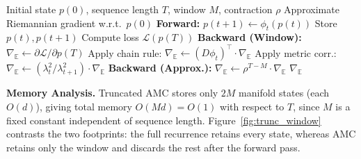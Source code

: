 \documentclass[a4paper,fleqn]{cas-dc}
\begin{document}
\begin{algorithm}[htbp]
\footnotesize
\caption{Truncated AMC with $O(M)$ Stored States}
\label{alg:dvm_truncated}
\begin{algorithmic}[1]
\Require Initial state $p(0)$, sequence length $T$, window $M$, contraction $\rho$
\Ensure Approximate Riemannian gradient w.r.t.\ $p(0)$
\State \textbf{Forward:}
    \State $p(t+1) \leftarrow \phi_t(p(t))$
        \State Store $p(t), p(t+1)$ 
    \EndIf
\EndFor
\State Compute loss $\mathcal{L}(p(T))$
\State \textbf{Backward (Window):}
\State $\nabla_{\mathbb{E}} \leftarrow \partial\mathcal{L}/\partial p(T)$
    \State Apply chain rule: $\nabla_{\mathbb{E}} \leftarrow (D\phi_t)^\top \cdot \nabla_{\mathbb{E}}$
    \State Apply metric corr.: $\nabla_{\mathbb{E}} \leftarrow (\lambda_t^2/\lambda_{t+1}^2) \cdot \nabla_{\mathbb{E}}$
\EndFor
\State \textbf{Backward (Approx.):}
\State $\nabla_{\mathbb{E}} \leftarrow \rho^{T-M} \cdot \nabla_{\mathbb{E}}$ 
\State \Return $\nabla_{\mathbb{E}}$
\end{algorithmic}
\end{algorithm}

\textbf{Memory Analysis.} Truncated AMC stores only $2M$ manifold states (each $O(d)$), giving total memory $O(Md) = O(1)$ with respect to $T$, since $M$ is a fixed constant independent of sequence length. Figure~\ref{fig:trunc_window} contrasts the two footprints: the full recurrence retains every state, whereas AMC retains only the window and discards the rest after the forward pass.
\end{document}
